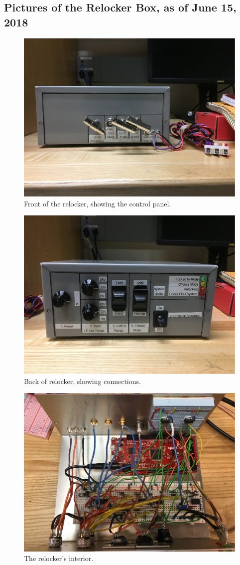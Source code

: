 \documentclass[10pt]{report}
\begin{document}
\begin{appendices}

\section{Pictures of the Relocker Box, as of June 15, 2018}

\begin{figure}[H]
    \centering
    \includegraphics[width=0.5\columnwidth]{includes/relockerFront.jpg}
    \caption{Front of the relocker, showing the control panel.}
    \label{fig:relockerFront}
\end{figure}

\begin{figure}[H]
    \centering
    \includegraphics[width=0.5\columnwidth]{includes/relockerBack.jpg}
    \caption{Back of relocker, showing connections.}
    \label{fig:relockerBack}
\end{figure}

\begin{figure}[H]
    \centering
	\includegraphics[width=0.5\columnwidth]{includes/relockerInterior.jpg}
    \caption{The relocker's interior.}
    \label{fig:relockerInterior}
\end{figure}


\end{appendices}
\end{document}
